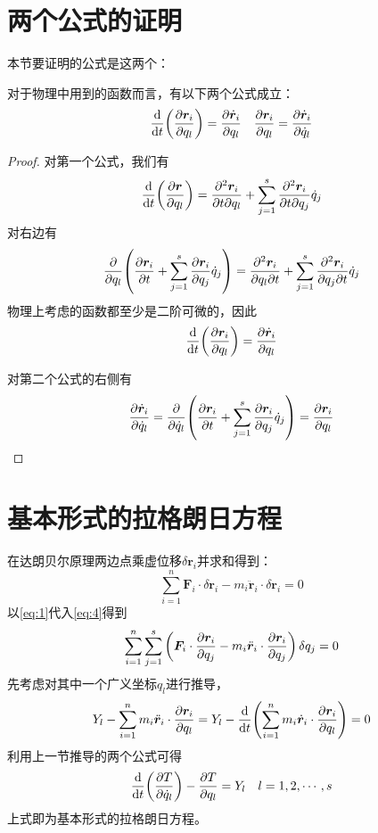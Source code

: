         \section{两个公式的证明}
        本节要证明的公式是这两个：
        \begin{theorem}\label{thm:两个公式}
            对于物理中用到的函数而言，有以下两个公式成立：
            \begin{equation}
                \label{equ:两个公式}
                \dv{t}(\pdv{\bm{r}_i}{q_l})=\pdv{\dot{\bm{r}}_i}{q_l} \quad \pdv{\bm{r}_i}{q_l}=\pdv{\dot{\bm{r}}_i}{\dot{q}_l}
            \end{equation}
        \end{theorem}
        \begin{proof}
            对第一个公式，我们有
            \[
            \dv{t}(\pdv{\bm{r}}{q_l})=\pdv[2]{\bm{r}_i}{t}{q_l}+\sum_{j=1}^{s}\pdv[2]{\bm{r}_i}{t}{q_j}\dot{q}_j
            \]
            对右边有
            \[
            \pdv{q_l}(\pdv{\bm{r}_i}{t}+\sum_{j=1}^{s}\pdv{\bm{r}_i}{q_j}\dot{q}_j)=\pdv[2]{\bm{r}_i}{q_l}{t}+\sum_{j=1}^{s}\pdv[2]{\bm{r}_i}{q_j}{t}\dot{q}_j
            \]
            物理上考虑的函数都至少是二阶可微的，因此
            \[
            \dv{t}(\pdv{\bm{r}_i}{q_l})=\pdv{\dot{\bm{r}}_i}{q_l}
            \]

            对第二个公式的右侧有
            \[
            \pdv{\dot{\bm{r}}_i}{\dot{q}_l}=\pdv{\dot{q}_l}(\pdv{\bm{r}_i}{t}+\sum_{j=1}^{s}\pdv{\bm{r}_i}{q_j}\dot{q}_j)=\pdv{\bm{r}_i}{q_l}
            \]
        \end{proof}
        
        \section{基本形式的拉格朗日方程}
        在达朗贝尔原理两边点乘虚位移$\delta\bm{r}_i$并求和得到：
        \begin{equation}
            \label{eq:4}
            \sum_{i=1}^{n}\bm{F}_i\cdot\delta\bm{r}_i-m_i\ddot{\bm{r}}_i\cdot\delta\bm{r}_i=0
        \end{equation}
        以\ref{eq:1}代入\ref{eq:4}得到
        \begin{equation}
            \label{eq:5}
            \sum_{i=1}^{n}\sum_{j=1}^{s}\left(\bm{F}_i\cdot\pdv{\bm{r}_i}{q_j}-m_i\ddot{\bm{r}}_i\cdot\pdv{\bm{r}_i}{q_j}\right)\delta q_j=0
        \end{equation}
        先考虑对其中一个广义坐标$q_l$进行推导，
        \begin{equation}
            \label{eq:6}
            Y_l - \sum_{i=1}^{n}m_i\ddot{\bm{r}}_i\cdot\pdv{\bm{r}_i}{q_l} = Y_l - \dv{t}(\sum_{i=1}^{n}m_i\dot{\bm{r}}_i\cdot\pdv{\bm{r}_i}{q_l}) = 0
        \end{equation}
        利用上一节推导的两个公式可得
        \begin{equation}
            \label{eq:7}
            \dv{t}(\pdv{T}{\dot{q}_l})-\pdv{T}{q_l}=Y_l \quad l=1,2,\cdots,s
        \end{equation}
        上式即为基本形式的拉格朗日方程。

